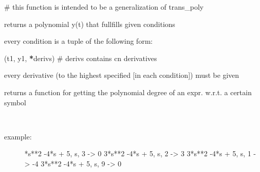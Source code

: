 \documentclass[letterpaper,10pt,english]{sphinxmanual}
\begin{document}

\begin{fulllineitems}
\label{pycontroltools:auxfuncs.math.polynomial.condition_poly}
\# this function is intended to be a generalization of trans\_poly

returns a polynomial y(t) that fullfills given conditions

every condition is a tuple of the following form:

(t1, y1,  {\color{red}\bfseries{}*}derivs) \# derivs contains cn derivatives

every derivative (to the highest specified {[}in each condition{]}) must be given

\end{fulllineitems}


\begin{fulllineitems}
\label{pycontroltools:auxfuncs.math.polynomial.element_deg_factory}
returns a function for getting the polynomial degree of an expr. w.r.t.
a certain symbol

\end{fulllineitems}


\begin{fulllineitems}
\label{pycontroltools:auxfuncs.math.polynomial.get_order_coeff_from_expr}~\begin{description}
\item[{example:}] *s**2 -4*s + 5, s, 3 -\textgreater{} 0
3*s**2 -4*s + 5, s, 2 -\textgreater{} 3
3*s**2 -4*s + 5, s, 1 -\textgreater{} -4
3*s**2 -4*s + 5, s, 9 -\textgreater{} 0

\end{description}

\end{fulllineitems}

\end{document}
